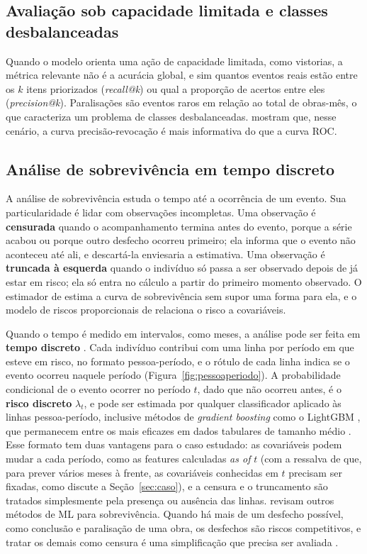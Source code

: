 \subsection{Avaliação sob capacidade limitada e classes desbalanceadas}
\label{sec:avaliacao-capacidade}

Quando o modelo orienta uma ação de capacidade limitada, como vistorias, a métrica relevante não é a acurácia global, e sim quantos eventos reais estão entre os $k$ itens priorizados (\textit{recall@k}) ou qual a proporção de acertos entre eles (\textit{precision@k}). Paralisações são eventos raros em relação ao total de obras-mês, o que caracteriza um problema de classes desbalanceadas.  mostram que, nesse cenário, a curva precisão-revocação é mais informativa do que a curva ROC.

\subsection{Análise de sobrevivência em tempo discreto}
\label{sec:sobrevivencia}

A análise de sobrevivência estuda o tempo até a ocorrência de um evento. Sua particularidade é lidar com observações incompletas. Uma observação é \textbf{censurada} quando o acompanhamento termina antes do evento, porque a série acabou ou porque outro desfecho ocorreu primeiro; ela informa que o evento não aconteceu até ali, e descartá-la enviesaria a estimativa. Uma observação é \textbf{truncada à esquerda} quando o indivíduo só passa a ser observado depois de já estar em risco; ela só entra no cálculo a partir do primeiro momento observado. O estimador de  estima a curva de sobrevivência sem supor uma forma para ela, e o modelo de riscos proporcionais de  relaciona o risco a covariáveis.

Quando o tempo é medido em intervalos, como meses, a análise pode ser feita em \textbf{tempo discreto} \cite{singer2003,tutz2016}. Cada indivíduo contribui com uma linha por período em que esteve em risco, no formato pessoa-período, e o rótulo de cada linha indica se o evento ocorreu naquele período (Figura~\ref{fig:pessoaperiodo}). A probabilidade condicional de o evento ocorrer no período $t$, dado que não ocorreu antes, é o \textbf{risco discreto} $\lambda_t$, e pode ser estimada por qualquer classificador aplicado às linhas pessoa-período, inclusive métodos de \textit{gradient boosting} como o LightGBM \cite{ke2017}, que permanecem entre os mais eficazes em dados tabulares de tamanho médio \cite{grinsztajn2022}. Esse formato tem duas vantagens para o caso estudado: as covariáveis podem mudar a cada período, como as features calculadas \textit{as of} $t$ (com a ressalva de que, para prever vários meses à frente, as covariáveis conhecidas em $t$ precisam ser fixadas, como discute a Seção~\ref{sec:caso}), e a censura e o truncamento são tratados simplesmente pela presença ou ausência das linhas.  revisam outros métodos de ML para sobrevivência. Quando há mais de um desfecho possível, como conclusão e paralisação de uma obra, os desfechos são riscos competitivos, e tratar os demais como censura é uma simplificação que precisa ser avaliada \cite{fine1999}.

